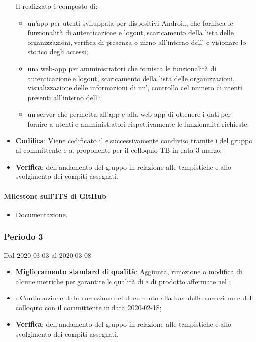 \begin{itemize}
	Il  realizzato è composto di:
	\begin{itemize}
		\item un'app per utenti sviluppata per dispositivi Android, che fornisca le funzionalità di autenticazione e logout, scaricamento della lista delle organizzazioni, verifica di presenza o meno all'interno dell' e visionare lo storico degli accessi;
		\item una web-app per amministratori che fornisca le funzionalità di autenticazione e logout, scaricamento della lista delle organizzazioni, visualizzazione delle informazioni di un', controllo del numero di utenti presenti all'interno dell';
		\item un server che permetta all'app e alla web-app di ottenere i dati per fornire a utenti e amministratori rispettivamente le funzionalità richieste.
	\end{itemize}
	\item \textbf{Codifica}: Viene codificato il  e successivamente condiviso tramite i  del gruppo al committente e al proponente per il colloquio TB in data 3 marzo;
	\item \textbf{Verifica}:  dell'andamento del gruppo in relazione alle tempistiche e allo svolgimento dei compiti assegnati.
\end{itemize}
\paragraph{Milestone sull'ITS di GitHub}
\begin{itemize}
	\item \href{https://github.com/qb-team/Stalker-Documentazione/milestone/9}{Documentazione}.
\end{itemize}

\subsubsection{Periodo 3} 
Dal 2020-03-03 al 2020-03-08
\begin{itemize}
	\item \textbf{Miglioramento standard di qualità}: Aggiunta, rimozione o modifica di alcune metriche per garantire le qualità di  e di prodotto affermate nel \PdQ{};
	\item \textbf{\AdR{}}: Continuazione della correzione del documento alla luce della correzione e del colloquio con il committente in data 2020-02-18;
	\item \textbf{Verifica}:  dell'andamento del gruppo in relazione alle tempistiche e allo svolgimento dei compiti assegnati.
\end{itemize}
